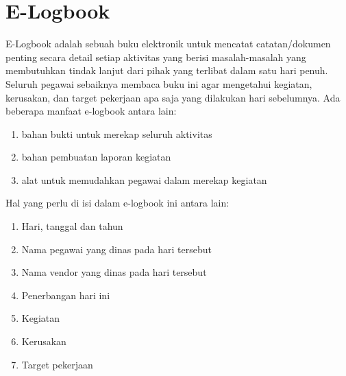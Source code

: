 \section{E-Logbook}
E-Logbook adalah sebuah buku elektronik untuk mencatat catatan/dokumen penting secara detail setiap aktivitas yang berisi masalah-masalah yang membutuhkan tindak lanjut dari pihak yang terlibat dalam satu hari penuh. Seluruh pegawai sebaiknya membaca buku ini agar mengetahui kegiatan, kerusakan, dan target pekerjaan apa saja yang dilakukan hari sebelumnya. Ada beberapa manfaat e-logbook antara lain:
\begin{enumerate}
\item bahan bukti untuk merekap seluruh aktivitas
\item bahan pembuatan laporan kegiatan
\item alat untuk memudahkan pegawai dalam merekap kegiatan
 \end{enumerate}

Hal yang perlu di isi dalam e-logbook ini antara lain:
\begin{enumerate}
\item Hari, tanggal dan tahun
\item Nama pegawai yang dinas pada hari tersebut
\item Nama vendor yang dinas pada hari tersebut
\item Penerbangan hari ini
\item Kegiatan
\item Kerusakan
\item Target pekerjaan
\end{enumerate}

